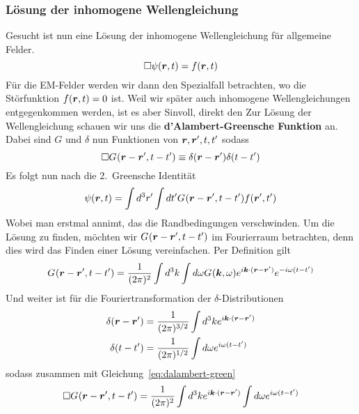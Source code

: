 \subsubsection{Lösung der inhomogene Wellengleichung}%
\label{ssub:inhomogene-wellengleichung}
Gesucht ist nun eine Lösung der inhomogene Wellengleichung für allgemeine Felder.
\begin{equation}
  \Box \psi(\vb*r, t) = f(\vb*r, t)
\end{equation}
Für die EM-Felder werden wir dann den Spezialfall betrachten, wo die Störfunktion $f(\vb*r, t)=0$ ist. Weil wir später auch inhomogene Wellengleichungen entgegenkommen werden, ist es aber Sinvoll, direkt den
Zur Lösung der Wellengleichung schauen wir uns die \textbf{d'Alambert-Greensche Funktion} an. Dabei sind $G$ und $\delta$ nun Funktionen von $\vb*r, \vb*r', t, t'$ sodass
\begin{equation}
  \label{eq:dalambert-green}
  \Box G_{}(\vb*r-\vb*r',t-t') \equiv \delta(\vb*r-\vb*r')\delta(t-t')
\end{equation}
Es folgt nun nach die 2.\ Greensche Identität
\begin{equation}
  \label{eq:psi-green}
  \psi(\vb*r, t) = \int d^3r'\int dt' G_{}(\vb*r-\vb*r',t-t') f(\vb*r', t')
\end{equation}
Wobei man erstmal annimt, das die Randbedingungen verschwinden. Um die Lösung zu finden, möchten wir $G_{}(\vb*r-\vb*r',t-t')$ im Fourierraum betrachten, denn dies wird das Finden einer Lösung vereinfachen. Per Definition gilt
\begin{equation}
  \label{eq:fourier-dalembert-green}
  G_{}(\vb*r-\vb*r',t-t') = \frac{1}{(2\pi)^2} \int d^3k\int d\omega G_{}(\vb*k,\omega) e^{i\vb*k\cdot(\vb*r-\vb*r')}
  e^{-i\omega(t-t')}
\end{equation}
Und weiter ist für die Fouriertransformation der $\delta$-Distributionen
\begin{equation}
  \begin{split}
    \delta(\vb*r-\vb*r')
    &= 
    \frac{1}{(2\pi)^{3/2}} 
    \int d^3k e^{i\vb*k\cdot(\vb*r-\vb*r')}\\
    \delta(t-t')
    &= 
    \frac{1}{(2\pi)^{1/2}} 
    \int d\omega e^{i\omega(t-t')}\\
  \end{split}
\end{equation}
sodass zusammen mit Gleichung~\ref{eq:dalambert-green}
\begin{equation}
  \label{eq:fourier-dalembert-green2}
  \Box G_{}(\vb*r-\vb*r',t-t') =
    \frac{1}{(2\pi)^2} 
    \int d^3k e^{i\vb*k\cdot(\vb*r-\vb*r')}
    \int d\omega e^{i\omega(t-t')}
\end{equation}
